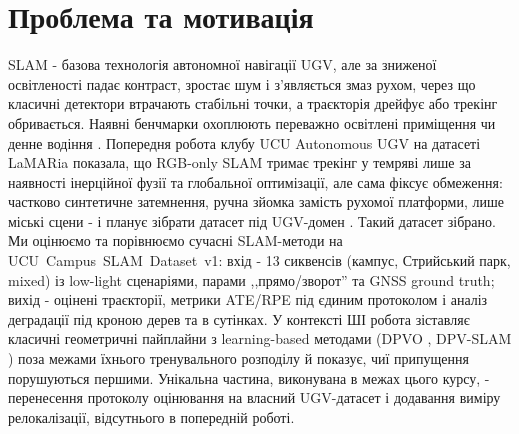 \documentclass[ukrainian]{ucuproposal}
\begin{document}
\maketitlepage

\section{Проблема та мотивація}
SLAM - базова технологія автономної навігації UGV, але за зниженої
освітленості падає контраст, зростає шум і з'являється змаз рухом, через
що класичні детектори втрачають стабільні точки, а траєкторія дрейфує або
трекінг обривається. Наявні бенчмарки охоплюють переважно освітлені
приміщення \cite{burri2016euroc} чи денне водіння \cite{geiger2012kitti}.
Попередня робота клубу UCU Autonomous UGV на датасеті LaMARia
\cite{krishnan2025lamaria} показала, що RGB-only SLAM тримає трекінг у
темряві лише за наявності інерційної фузії та глобальної оптимізації, але
сама фіксує обмеження: частково синтетичне затемнення, ручна зйомка
замість рухомої платформи, лише міські сцени - і планує зібрати датасет
під UGV-домен \cite{basystyi2026lowlight}. Такий датасет зібрано. Ми
оцінюємо та порівнюємо сучасні SLAM-методи на \mbox{UCU Campus SLAM
Dataset v1}: вхід - 13 сиквенсів (кампус, Стрийський парк, mixed) із
low-light сценаріями, парами ,,прямо/зворот'' та GNSS ground truth; вихід
- оцінені траєкторії, метрики ATE/RPE під єдиним протоколом і аналіз
деградації під кроною дерев та в сутінках. У контексті ШІ робота
зіставляє класичні геометричні пайплайни з learning-based методами
(DPVO \cite{teed2023dpvo}, DPV-SLAM \cite{lipson2024dpvslam}) поза межами
їхнього тренувального розподілу й показує, чиї припущення порушуються
першими. Унікальна частина, виконувана в межах цього курсу, -
перенесення протоколу оцінювання на власний UGV-датасет і додавання
виміру релокалізації, відсутнього в попередній роботі.
\end{document}
